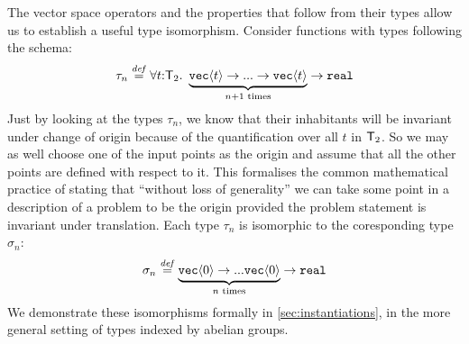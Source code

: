 \begin{example}\label{ex:type-iso}
  The vector space operators and the properties that follow from their
  types allow us to establish a useful type isomorphism. Consider
  functions with types following the schema:
  \begin{displaymath}
    \tau_{n} \stackrel{\mathit{def}}= \forall
    t\mathord:\mathsf{T}_2.\ \underbrace{\textup{\texttt{vec}}\langle t \rangle \to ... \to
      \textup{\texttt{vec}}\langle t \rangle}_{n+1\textrm{ times}} \to \textup{\texttt{real}}
  \end{displaymath}
  Just by looking at the types $\tau_{n}$, we know that their
  inhabitants will be invariant under change of origin because of the
  quantification over all $t$ in $\mathsf{T}_2$. So we may as well
  choose one of the input points as the origin and assume that all the
  other points are defined with respect to it.  This formalises the
  common mathematical practice of stating that ``without loss of
  generality'' we can take some point in a description of a problem to
  be the origin provided the problem statement is invariant under
  translation. Each type $\tau_{n}$ is isomorphic to the coresponding
  type $\sigma_{n}$:
  \begin{displaymath}
    \sigma_{n} \stackrel{\mathit{def}}= \underbrace{\textup{\texttt{vec}}\langle 0 \rangle \to
      ... \textup{\texttt{vec}}\langle 0 \rangle}_{n\textrm{ times}} \to \textup{\texttt{real}}
  \end{displaymath}
  We demonstrate these isomorphisms formally in
  \autoref{sec:instantiations}, in the more general setting of types
  indexed by abelian groups.
\end{example}

